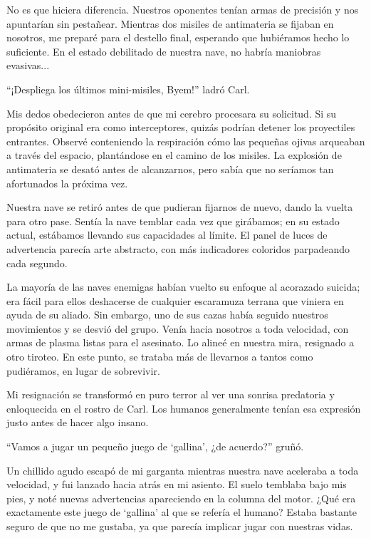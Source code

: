 No es que hiciera diferencia. Nuestros oponentes tenían armas de precisión y nos apuntarían sin pestañear. Mientras dos misiles de antimateria se fijaban en nosotros, me preparé para el destello final, esperando que hubiéramos hecho lo suficiente. En el estado debilitado de nuestra nave, no habría maniobras evasivas...

“¡Despliega los últimos mini-misiles, Byem!” ladró Carl.

Mis dedos obedecieron antes de que mi cerebro procesara su solicitud. Si su propósito original era como interceptores, quizás podrían detener los proyectiles entrantes. Observé conteniendo la respiración cómo las pequeñas ojivas arqueaban a través del espacio, plantándose en el camino de los misiles. La explosión de antimateria se desató antes de alcanzarnos, pero sabía que no seríamos tan afortunados la próxima vez.

Nuestra nave se retiró antes de que pudieran fijarnos de nuevo, dando la vuelta para otro pase. Sentía la nave temblar cada vez que girábamos; en su estado actual, estábamos llevando sus capacidades al límite. El panel de luces de advertencia parecía arte abstracto, con más indicadores coloridos parpadeando cada segundo.

La mayoría de las naves enemigas habían vuelto su enfoque al acorazado suicida; era fácil para ellos deshacerse de cualquier escaramuza terrana que viniera en ayuda de su aliado. Sin embargo, uno de sus cazas había seguido nuestros movimientos y se desvió del grupo. Venía hacia nosotros a toda velocidad, con armas de plasma listas para el asesinato. Lo alineé en nuestra mira, resignado a otro tiroteo. En este punto, se trataba más de llevarnos a tantos como pudiéramos, en lugar de sobrevivir.

Mi resignación se transformó en puro terror al ver una sonrisa predatoria y enloquecida en el rostro de Carl. Los humanos generalmente tenían esa expresión justo antes de hacer algo insano.

“Vamos a jugar un pequeño juego de ‘gallina’, ¿de acuerdo?” gruñó.

Un chillido agudo escapó de mi garganta mientras nuestra nave aceleraba a toda velocidad, y fui lanzado hacia atrás en mi asiento. El suelo temblaba bajo mis pies, y noté nuevas advertencias apareciendo en la columna del motor. ¿Qué era exactamente este juego de ‘gallina’ al que se refería el humano? Estaba bastante seguro de que no me gustaba, ya que parecía implicar jugar con nuestras vidas.

